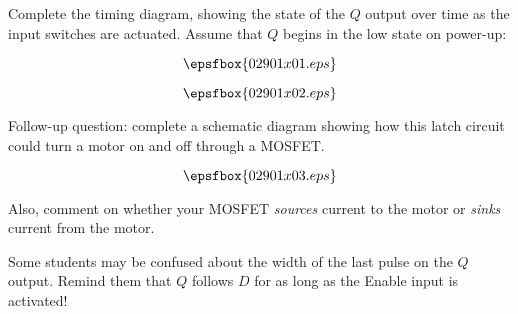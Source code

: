 

Complete the timing diagram, showing the state of the $Q$ output over time as the input switches are actuated.  Assume that $Q$ begins in the low state on power-up:

$$\epsfbox{02901x01.eps}$$







$$\epsfbox{02901x02.eps}$$

\vskip 10pt

Follow-up question: complete a schematic diagram showing how this latch circuit could turn a motor on and off through a MOSFET.

$$\epsfbox{02901x03.eps}$$

Also, comment on whether your MOSFET {\it sources} current to the motor or {\it sinks} current from the motor.







Some students may be confused about the width of the last pulse on the $Q$ output.  Remind them that $Q$ follows $D$ for as long as the Enable input is activated!





